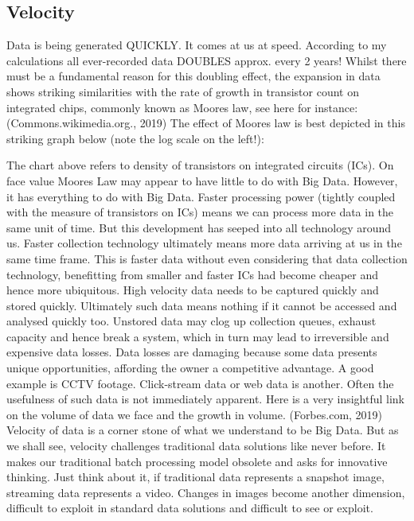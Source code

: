  

\subsection{Velocity}
Data is being generated QUICKLY.  It comes at us at speed.  According to my calculations all ever-recorded data DOUBLES approx. every 2 years!  Whilst there must be a fundamental reason for this doubling effect, the expansion in data shows striking similarities with the rate of growth in transistor count on integrated chips, commonly known as Moore\textquotesingle s law, see here for instance:
(Commons.wikimedia.org., 2019)
The effect of Moore\textquotesingle s law is best depicted in this striking graph below (note the log scale on the left!): 




The chart above refers to density of transistors on integrated circuits (ICs).  On face value Moore\textquotesingle s Law may appear to have little to do with Big Data.  However, it has everything to do with Big Data.  Faster processing power (tightly coupled with the measure of transistors on ICs) means we can process more data in the same unit of time.  But this development has seeped into all technology around us.  Faster collection technology ultimately means more data arriving at us in the same time frame.  This is faster data without even considering that data collection technology, benefitting from smaller and faster ICs had become cheaper and hence more ubiquitous.  High velocity data needs to be captured quickly and stored quickly.  Ultimately such data means nothing if it cannot be accessed and analysed quickly too. Unstored data may clog up collection queues, exhaust capacity and hence break a system, which in turn may lead to irreversible and expensive data losses. Data losses are damaging because some data presents unique opportunities, affording the owner a competitive advantage. A good example is CCTV footage. Click-stream data or web data is another.  Often the usefulness of such data is not immediately apparent.   
Here is a very insightful link on the volume of data we face and the growth in volume.
(Forbes.com, 2019)
Velocity of data is a corner stone of what we understand to be Big Data.  But as we shall see, velocity challenges traditional data solutions like never before.  It makes our traditional batch processing model obsolete and asks for innovative thinking.  Just think about it, if traditional data represents a snapshot image, streaming data represents a video.  Changes in images become another dimension, difficult to exploit in standard data solutions and difficult to see or exploit.
